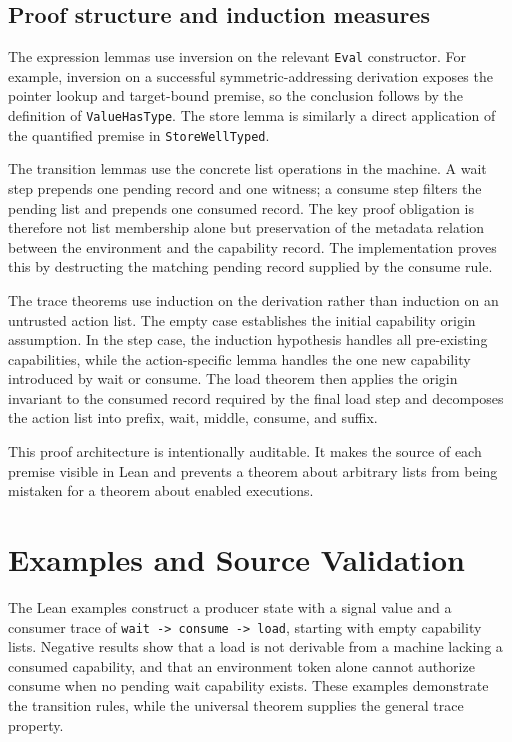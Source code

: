 \documentclass[a4paper,USenglish]{lipics-v2021}
\begin{document}
\subsection{Proof structure and induction measures}
The expression lemmas use inversion on the relevant \texttt{Eval} constructor.
For example, inversion on a successful symmetric-addressing derivation exposes
the pointer lookup and target-bound premise, so the conclusion follows by the
definition of \texttt{ValueHasType}. The store lemma is similarly a direct
application of the quantified premise in \texttt{StoreWellTyped}.

The transition lemmas use the concrete list operations in the machine. A wait
step prepends one pending record and one witness; a consume step filters the
pending list and prepends one consumed record. The key proof obligation is
therefore not list membership alone but preservation of the metadata relation
between the environment and the capability record. The implementation proves
this by destructing the matching pending record supplied by the consume rule.

The trace theorems use induction on the derivation rather than induction on an
untrusted action list. The empty case establishes the initial capability
origin assumption. In the step case, the induction hypothesis handles all
pre-existing capabilities, while the action-specific lemma handles the one
new capability introduced by wait or consume. The load theorem then applies
the origin invariant to the consumed record required by the final load step
and decomposes the action list into prefix, wait, middle, consume, and suffix.

This proof architecture is intentionally auditable. It makes the source of
each premise visible in Lean and prevents a theorem about arbitrary lists from
being mistaken for a theorem about enabled executions.

\section{Examples and Source Validation}
The Lean examples construct a producer state with a signal value and a consumer trace of \texttt{wait -> consume -> load}, starting with empty capability lists. Negative results show that a load is not derivable from a machine lacking a consumed capability, and that an environment token alone cannot authorize consume when no pending wait capability exists. These examples demonstrate the transition rules, while the universal theorem supplies the general trace property.
\end{document}
